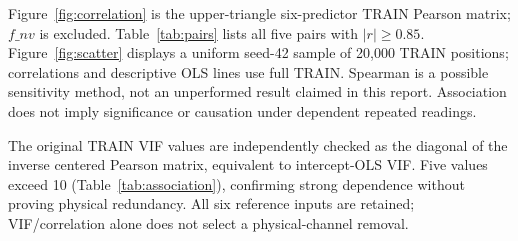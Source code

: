\documentclass[conference]{IEEEtran}
\begin{document}
Figure~\ref{fig:correlation} is the upper-triangle six-predictor TRAIN Pearson matrix; $f\_nv$ is excluded. Table~\ref{tab:pairs} lists all five pairs with $|r|\geq0.85$. Figure~\ref{fig:scatter} displays a uniform seed-42 sample of 20,000 TRAIN positions; correlations and descriptive OLS lines use full TRAIN. Spearman is a possible sensitivity method, not an unperformed result claimed in this report. Association does not imply significance or causation under dependent repeated readings.

The original TRAIN VIF values are independently checked as the diagonal of the inverse centered Pearson matrix, equivalent to intercept-OLS VIF. Five values exceed 10 (Table~\ref{tab:association}), confirming strong dependence without proving physical redundancy. All six reference inputs are retained; VIF/correlation alone does not select a physical-channel removal.
\end{document}
